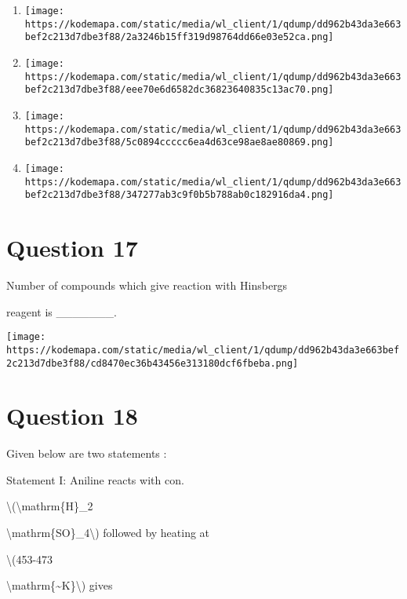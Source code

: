 \documentclass{article}
\begin{document}
\begin{enumerate}[label=(\alph*)]
\item \texttt{[image: https://kodemapa.com/static/media/wl\_client/1/qdump/dd962b43da3e663bef2c213d7dbe3f88/2a3246b15ff319d98764dd66e03e52ca.png]}


\item \texttt{[image: https://kodemapa.com/static/media/wl\_client/1/qdump/dd962b43da3e663bef2c213d7dbe3f88/eee70e6d6582dc36823640835c13ac70.png]}


\item \texttt{[image: https://kodemapa.com/static/media/wl\_client/1/qdump/dd962b43da3e663bef2c213d7dbe3f88/5c0894ccccc6ea4d63ce98ae8ae80869.png]}


\item \texttt{[image: https://kodemapa.com/static/media/wl\_client/1/qdump/dd962b43da3e663bef2c213d7dbe3f88/347277ab3c9f0b5b788ab0c182916da4.png]}


\end{enumerate}
\newpage
\section*{Question 17}
Number of compounds which give reaction with Hinsberg\textquotesingle s

reagent is \_\_\_\_\_\_\_.



\texttt{[image: https://kodemapa.com/static/media/wl\_client/1/qdump/dd962b43da3e663bef2c213d7dbe3f88/cd8470ec36b43456e313180dcf6fbeba.png]}\\



\hfill\break


\begin{enumerate}[label=(\alph*)]
\end{enumerate}
\newpage
\section*{Question 18}
Given below are two statements :



Statement I: Aniline reacts with con.

\textbackslash(\textbackslash mathrm\{H\}\_2

\textbackslash mathrm\{SO\}\_4\textbackslash) followed by heating at

\textbackslash(453-473

\textbackslash mathrm\{\textasciitilde K\}\textbackslash) gives
\end{document}

